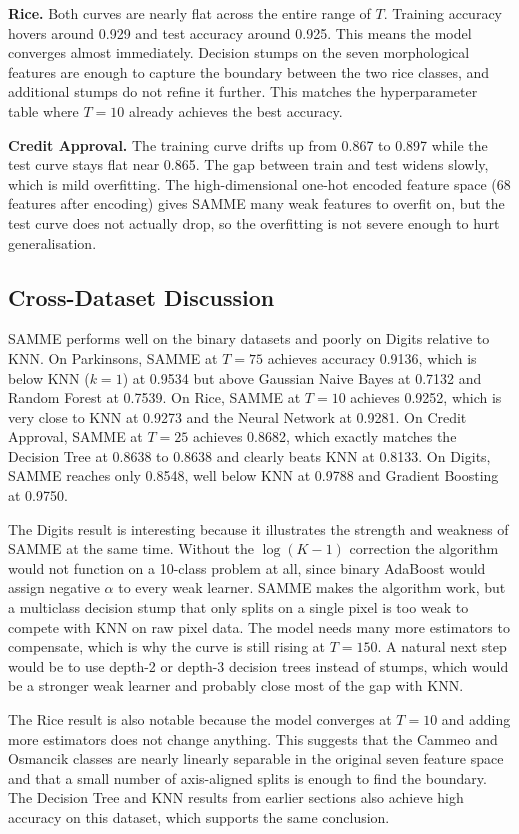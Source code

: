 \documentclass[11pt,letterpaper]{article}
\begin{document}
\textbf{Rice.} Both curves are nearly flat across the entire range of $T$.
Training accuracy hovers around 0.929 and test accuracy around 0.925. This
means the model converges almost immediately. Decision stumps on the seven
morphological features are enough to capture the boundary between the two
rice classes, and additional stumps do not refine it further. This matches
the hyperparameter table where $T=10$ already achieves the best accuracy.

\textbf{Credit Approval.} The training curve drifts up from 0.867 to 0.897
while the test curve stays flat near 0.865. The gap between train and test
widens slowly, which is mild overfitting. The high-dimensional one-hot
encoded feature space (68 features after encoding) gives SAMME many weak
features to overfit on, but the test curve does not actually drop, so the
overfitting is not severe enough to hurt generalisation.

\subsection{Cross-Dataset Discussion}

SAMME performs well on the binary datasets and poorly on Digits relative to
KNN. On Parkinsons, SAMME at $T=75$ achieves accuracy 0.9136, which is below
KNN ($k=1$) at 0.9534 but above Gaussian Naive Bayes at 0.7132 and Random
Forest at 0.7539. On Rice, SAMME at $T=10$ achieves 0.9252, which is very
close to KNN at 0.9273 and the Neural Network at 0.9281. On Credit Approval,
SAMME at $T=25$ achieves 0.8682, which exactly matches the Decision Tree at
0.8638 to 0.8638 and clearly beats KNN at 0.8133. On Digits, SAMME reaches
only 0.8548, well below KNN at 0.9788 and Gradient Boosting at 0.9750.

The Digits result is interesting because it illustrates the strength and
weakness of SAMME at the same time. Without the $\log(K-1)$ correction the
algorithm would not function on a 10-class problem at all, since binary
AdaBoost would assign negative $\alpha$ to every weak learner. SAMME makes
the algorithm work, but a multiclass decision stump that only splits on a
single pixel is too weak to compete with KNN on raw pixel data. The model
needs many more estimators to compensate, which is why the curve is still
rising at $T=150$. A natural next step would be to use depth-2 or depth-3
decision trees instead of stumps, which would be a stronger weak learner
and probably close most of the gap with KNN.

The Rice result is also notable because the model converges at $T=10$ and
adding more estimators does not change anything. This suggests that the
Cammeo and Osmancik classes are nearly linearly separable in the original
seven feature space and that a small number of axis-aligned splits is enough
to find the boundary. The Decision Tree and KNN results from earlier
sections also achieve high accuracy on this dataset, which supports the same
conclusion.
\end{document}
